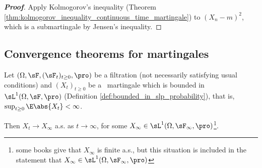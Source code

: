 \begin{proof}[\bf Proof]
Apply Kolmogorov's inequality (Theorem \ref{thm:kolmogorov_inequality_continuous_time_martingale}) to $(X⁢_n -m)^2$, which is a submartingale by Jensen's inequality.
\end{proof}


\subsection{Convergence theorems for martingales}

\begin{theorem}\label{thm:martingale_convergence_continuous}
Let $(\Omega,\sF,(\sF_t)_{t\geq 0}, \pro)$ be a filtration (not necessarily satisfying usual conditions) and $(X_t)_{t \geq  0}$ be a \cadlag\ martingale which is bounded in $\sL^1(\Omega,\sF,\pro)$ (Definition
\ref{def:bounded_in_slp_probability}), that is, $\sup_{t\geq 0}\E\abs{X_t} <\infty$.

Then $X_t \to X_\infty$ a.s. as $t \to \infty$, for some $X_\infty \in \sL^1(\Omega,\sF_\infty,\pro)$\footnote{some books give that $X_\infty$ is finite a.s., but this situation is included in the statement that $X_\infty
\in \sL^1(\Omega,\sF_\infty,\pro)$}.
\end{theorem}


